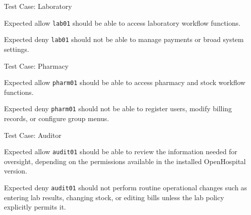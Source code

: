 \documentclass[presentation]{beamer}
\begin{document}
\begin{frame}[c]{Test Case: Laboratory}
\begin{block}{Expected allow}
\texttt{lab01} should be able to access laboratory workflow functions.
\end{block}

\begin{exampleblock}{Expected deny}
\texttt{lab01} should not be able to manage payments or broad system settings.
\end{exampleblock}
\end{frame}

\begin{frame}[c]{Test Case: Pharmacy}
\begin{block}{Expected allow}
\texttt{pharm01} should be able to access pharmacy and stock workflow functions.
\end{block}

\begin{exampleblock}{Expected deny}
\texttt{pharm01} should not be able to register users, modify billing records, or configure group
menus.
\end{exampleblock}
\end{frame}

\begin{frame}[c]{Test Case: Auditor}
\begin{block}{Expected allow}
\texttt{audit01} should be able to review the information needed for oversight, depending on the
permissions available in the installed OpenHospital version.
\end{block}

\begin{exampleblock}{Expected deny}
\texttt{audit01} should not perform routine operational changes such as entering lab results,
changing stock, or editing bills unless the lab policy explicitly permits it.
\end{exampleblock}
\end{frame}
\end{document}

